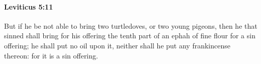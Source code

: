 
		\paragraph{Leviticus 5:11} %
			\label{LEVITICUS-5-11}

			But if he be not able to bring two turtledoves, or two young pigeons, then he that sinned shall bring for his offering the tenth part of an ephah of fine flour for a sin offering; he shall put no oil upon it, neither shall he put any frankincense thereon: for it is a sin offering.


